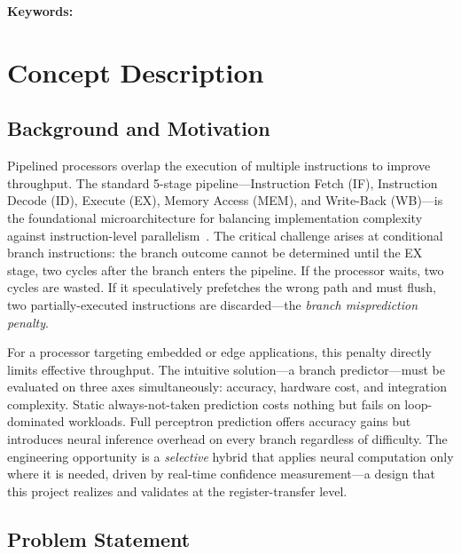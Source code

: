 \documentclass[12pt,a4paper]{article}
\begin{document}
\bigskip
\noindent\textbf{Keywords:}\ \ProposalKeywords

\bigskip
\section{Concept Description}
\label{sec:concept}

\subsection{Background and Motivation}
\label{sec:background}

Pipelined processors overlap the execution of multiple instructions to improve
throughput. The standard 5-stage pipeline---Instruction Fetch (IF), Instruction
Decode (ID), Execute (EX), Memory Access (MEM), and Write-Back (WB)---is
the foundational microarchitecture for balancing implementation complexity against
instruction-level parallelism~\cite{patterson2020cod,hennessy2017quantitative}.
The critical challenge arises at conditional branch instructions: the branch
outcome cannot be determined until the EX stage, two cycles after the branch
enters the pipeline. If the processor waits, two cycles are wasted. If it
speculatively prefetches the wrong path and must flush, two partially-executed
instructions are discarded---the \emph{branch misprediction penalty}.

For a processor targeting embedded or edge applications, this penalty directly
limits effective throughput. The intuitive solution---a branch predictor---must
be evaluated on three axes simultaneously: accuracy, hardware cost, and
integration complexity. Static always-not-taken prediction costs nothing but
fails on loop-dominated workloads. Full perceptron prediction offers accuracy
gains but introduces neural inference overhead on every branch regardless of
difficulty. The engineering opportunity is a \emph{selective} hybrid that applies
neural computation only where it is needed, driven by real-time confidence
measurement---a design that this project realizes and validates at the
register-transfer level.

\subsection{Problem Statement}
\label{sec:problem}
\end{document}
